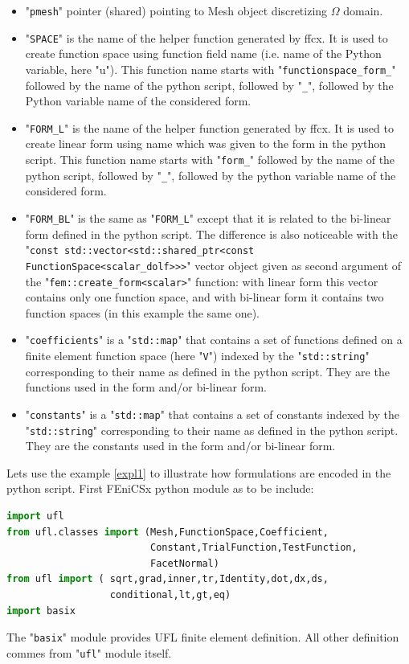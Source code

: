 \documentclass[12pt]{article}
\newcommand{\f}[1]{FEniCSx#1}
\newcommand{\mycode}[1]{\textsf{"}\lstinline`#1`\textsf{"}}
\newcommand{\mycodepy}[1]{\textsf{"}\lstinline[language=Python]`#1`\textsf{"}}
\begin{document}
\begin{itemize}
	\item \mycode{pmesh} pointer (shared) pointing to Mesh object discretizing $\Omega$ domain.
	\item \mycode{SPACE} is the name of the helper function generated by ffcx. It is used to create function space using function field name (i.e. name of the Python variable, here "u"). This function name starts with \mycode{functionspace_form_} followed by the name of the python script, followed by \mycode{_}, followed by the Python variable name of the considered form.
	\item \mycode{FORM_L} is the name of the helper function generated by ffcx. It is used to create linear form using name which was given to the form in the  python script. This function name starts with \mycode{form_} followed by the name of the python script, followed by \mycode{_}, followed by the python variable name of the considered form.
	\item \mycode{FORM_BL} is the same as \mycode{FORM_L} except that it is related to the bi-linear form defined in the python script. The difference  is also noticeable with  the  \mycode{const std::vector<std::shared_ptr<const FunctionSpace<scalar_dolf>>>} vector object given as second argument of the \mycode{fem::create_form<scalar>} function: with linear form this vector contains only one function space, and with bi-linear form it contains two function spaces (in this example the same one).
	\item \mycode{coefficients} is a \mycode{std::map} that contains a set of functions defined on a finite element function space (here \mycode{V}) indexed by the \mycode{std::string} corresponding to their name as defined in the python script. They are the functions used in the form and/or bi-linear form.
	\item \mycode{constants} is a \mycode{std::map} that contains a set of constants indexed by the \mycode{std::string} corresponding to their name as defined in the python script. They are the constants used in the form and/or bi-linear form.
\end{itemize}
Lets use the example \ref{expl1} to illustrate how formulations are encoded in the python script.
First \f{} python module as to be include:
\begin{lstlisting}[numbers=none,basicstyle=\footnotesize,language=Python]
import ufl
from ufl.classes import (Mesh,FunctionSpace,Coefficient,
                         Constant,TrialFunction,TestFunction,
                         FacetNormal)
from ufl import ( sqrt,grad,inner,tr,Identity,dot,dx,ds,
                  conditional,lt,gt,eq)
import basix
\end{lstlisting}
The \mycodepy{basix} module provides UFL finite element definition. All other definition commes from \mycodepy{ufl} module itself.
\end{document}
